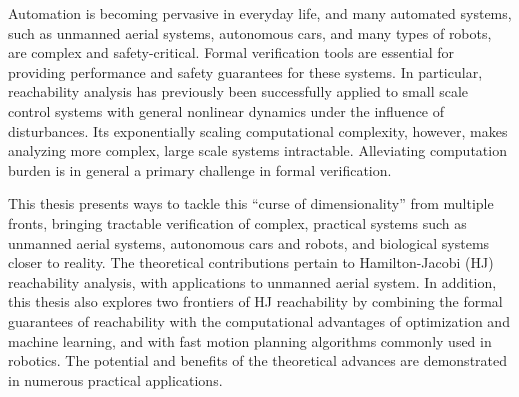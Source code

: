 \documentclass[12pt, oneside, final]{lib/ucthesis}
\begin{document}
\begin{frontmatter} 
\maketitle
\copyrightpage
\abstract
Automation is becoming pervasive in everyday life, and many automated systems, such as unmanned aerial systems, autonomous cars, and many types of robots, are complex and safety-critical. Formal verification tools are essential for providing performance and safety guarantees for these systems. In particular, reachability analysis has previously been successfully applied to small scale control systems with general nonlinear dynamics under the influence of disturbances. Its exponentially scaling computational complexity, however, makes analyzing more complex, large scale systems intractable. Alleviating computation burden is in general a primary challenge in formal verification.

This thesis presents ways to tackle this ``curse of dimensionality'' from multiple fronts, bringing tractable verification of complex, practical systems such as unmanned aerial systems, autonomous cars and robots, and biological systems closer to reality. The theoretical contributions pertain to Hamilton-Jacobi (HJ) reachability analysis, with applications to unmanned aerial system. In addition, this thesis also explores two frontiers of HJ reachability by combining the formal guarantees of reachability with the computational advantages of optimization and machine learning, and with fast motion planning algorithms commonly used in robotics. The potential and benefits of the theoretical advances are demonstrated in numerous practical applications.

\endabstract

\end{frontmatter}
\begin{optionalFrontMatter}
%
\end{optionalFrontMatter}

\tableofcontents
\end{document}
